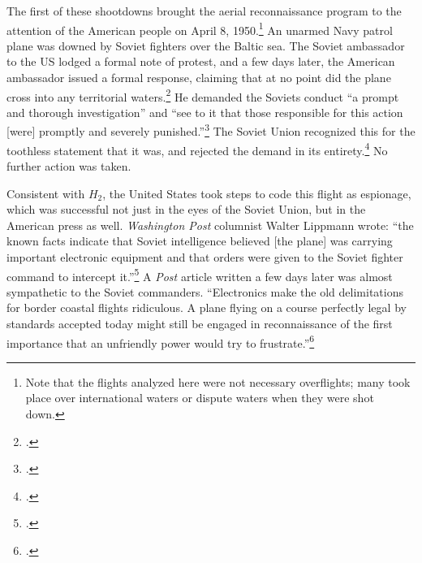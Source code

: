 \documentclass[14pt]{extarticle}
\begin{document}

The first of these shootdowns brought the aerial reconnaissance program to the attention of the American people on April 8, 1950.\footnote{Note that the flights analyzed here were not necessary overflights; many took place over international waters or dispute waters when they were shot down.} An unarmed Navy patrol plane was downed by Soviet fighters over the Baltic sea. The Soviet ambassador to the US lodged a formal note of protest, and a few days later, the American ambassador issued a formal response, claiming that at no point did the plane cross into any territorial waters.\footcite{kirk_ambassador_1950} He demanded the Soviets conduct \enquote{a prompt and thorough investigation} and \enquote{see to it that those responsible for this action [were] promptly and severely punished.}\footcite{the_associated_press_text_1950} The Soviet Union recognized this for the toothless statement that it was, and rejected the demand in its entirety.\footcite{salisbury_kremlin_1950} No further action was taken.

Consistent with $H_2$, the United States took steps to code this flight as espionage, which was successful not just in the eyes of the Soviet Union, but in the American press as well. \emph{Washington Post} columnist Walter Lippmann wrote: \enquote{the known facts indicate that Soviet intelligence \textelp{} believed [the plane] was carrying important electronic equipment and that orders were given to the Soviet fighter command to intercept it.}\footcite{lippmann_baltic_1950} A \emph{Post} article written a few days later was almost sympathetic to the Soviet commanders. \enquote{Electronics make the old delimitations for border coastal flights ridiculous. A plane flying on a course perfectly legal by standards accepted today might still be engaged in reconnaissance of the first importance that an unfriendly power would try to frustrate.}\footcite{childs_baltic_1950}

\end{document}
